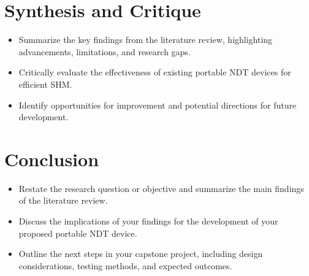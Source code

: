 \documentclass[journal, a4paper]{IEEEtran}
\begin{document}
\section{Synthesis and Critique}
\begin{itemize}
  \item Summarize the key findings from the literature review, highlighting advancements, limitations, and research gaps.
  \item Critically evaluate the effectiveness of existing portable NDT devices for efficient SHM.
  \item Identify opportunities for improvement and potential directions for future development.
\end{itemize}


\section{Conclusion}
\begin{itemize}
  \item Restate the research question or objective and summarize the main findings of the literature review.
  \item Discuss the implications of your findings for the development of your proposed portable NDT device.
  \item Outline the next steps in your capstone project, including design considerations, testing methods, and expected outcomes.
\end{itemize}








\ifCLASSOPTIONcaptionsoff
  \newpage
\fi



\end{document}
